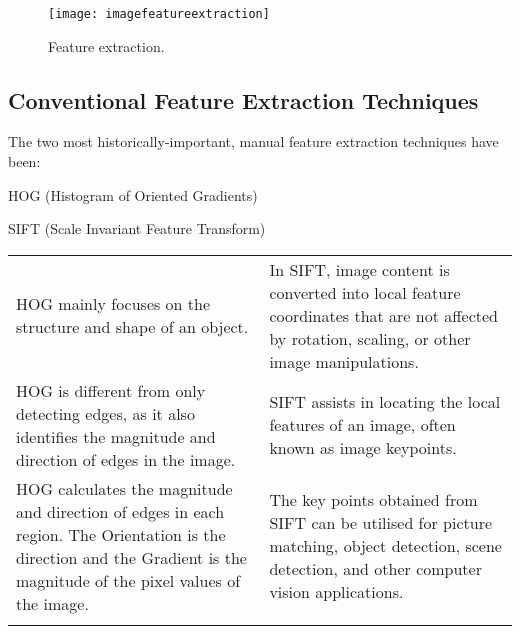	\begin{figure}[h]
		\centering
		\texttt{[image: imagefeatureextraction]}
		\caption{Feature extraction.}
		\label{fig:imagefeatureextraction}
	\end{figure}

	\subsection{Conventional Feature Extraction Techniques}
The two most historically-important, manual feature extraction techniques have been:
	\begin{bulletedlist}
		\item HOG (Histogram of Oriented Gradients)
		\item SIFT (Scale Invariant Feature Transform)
	\end{bulletedlist}

	\begin{table}
		\begin{tabular}{|p{}|p{}|} \hline
				\tablecolumnheadervlinesone{HOG} & \tablecolumnheadervlinestwo{SIFT} \\ \hline
				HOG mainly focuses on the structure and shape of an object. &
	            In SIFT, image content is converted into local feature coordinates that are not affected by rotation, scaling, or other
	image manipulations. \\ \hline
				HOG is different from only detecting edges, as it also identifies the magnitude and direction of edges in the image. &
	            SIFT assists in locating the local features of an image, often known as image keypoints. \\ \hline
				HOG calculates the magnitude and direction of edges in each region. The Orientation is the direction and the Gradient is the magnitude of the pixel values of the image. &
				The key points obtained from SIFT can be utilised for picture matching, object detection, scene detection, and other computer vision applications. \\ \hline
				\adjustbox{center}{\texttt{[image: hogfeaturedetection]}} &
				\adjustbox{center}{\texttt{[image: siftfeaturedetection]}} \\ \hline
		\end{tabular}
	\end{table}


